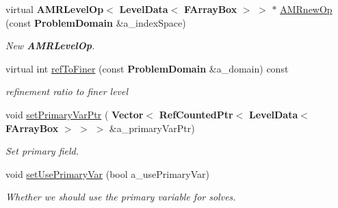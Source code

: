 \begin{DoxyCompactItemize}
virtual \textbf{ A\+M\+R\+Level\+Op}$<$ \textbf{ Level\+Data}$<$ \textbf{ F\+Array\+Box} $>$ $>$ $\ast$ \hyperlink{class_a_m_r_non_linear_multi_comp_op_factory_aa9a0f8df336179fba6a0ccb390914c55}{A\+M\+Rnew\+Op} (const \textbf{ Problem\+Domain} \&a\+\_\+index\+Space)
\begin{DoxyCompactList}\small\item\em New \textbf{ A\+M\+R\+Level\+Op}. \end{DoxyCompactList}\item 
\mbox{\label{class_a_m_r_non_linear_multi_comp_op_factory_adc8e5a9cb549809afed4d20cbcbe7aee}} 
virtual int \hyperlink{class_a_m_r_non_linear_multi_comp_op_factory_adc8e5a9cb549809afed4d20cbcbe7aee}{ref\+To\+Finer} (const \textbf{ Problem\+Domain} \&a\+\_\+domain) const
\begin{DoxyCompactList}\small\item\em refinement ratio to finer level \end{DoxyCompactList}\item 
\mbox{\label{class_a_m_r_non_linear_multi_comp_op_factory_a93acce1cf394f1bfcd607379483c3fea}} 
void \hyperlink{class_a_m_r_non_linear_multi_comp_op_factory_a93acce1cf394f1bfcd607379483c3fea}{set\+Primary\+Var\+Ptr} (\textbf{ Vector}$<$ \textbf{ Ref\+Counted\+Ptr}$<$ \textbf{ Level\+Data}$<$ \textbf{ F\+Array\+Box} $>$ $>$ $>$ \&a\+\_\+primary\+Var\+Ptr)
\begin{DoxyCompactList}\small\item\em Set primary field. \end{DoxyCompactList}\item 
\mbox{\label{class_a_m_r_non_linear_multi_comp_op_factory_a26cb81294d2e7f9e9ebe7b8fd65c9a97}} 
void \hyperlink{class_a_m_r_non_linear_multi_comp_op_factory_a26cb81294d2e7f9e9ebe7b8fd65c9a97}{set\+Use\+Primary\+Var} (bool a\+\_\+use\+Primary\+Var)
\begin{DoxyCompactList}\small\item\em Whether we should use the primary variable for solves. \end{DoxyCompactList}\item 
\mbox{\label{class_a_m_r_non_linear_multi_comp_op_factory_acff316ce90ff199f95b6858790d30c31}} 

\end{DoxyCompactItemize}
